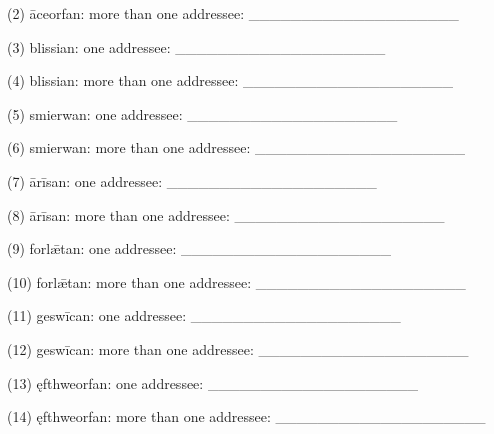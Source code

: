 \begin{minipage}{\linewidth}
(2) āceorfan: more than one addressee: \_\_\_\_\_\_\_\_\_\_\_\_\_\_\_\_\_\_\_\_

(3) blissian: one addressee: \_\_\_\_\_\_\_\_\_\_\_\_\_\_\_\_\_\_\_\_

(4) blissian: more than one addressee: \_\_\_\_\_\_\_\_\_\_\_\_\_\_\_\_\_\_\_\_

(5) smierwan: one addressee: \_\_\_\_\_\_\_\_\_\_\_\_\_\_\_\_\_\_\_\_

(6) smierwan: more than one addressee: \_\_\_\_\_\_\_\_\_\_\_\_\_\_\_\_\_\_\_\_

(7) ārīsan: one addressee: \_\_\_\_\_\_\_\_\_\_\_\_\_\_\_\_\_\_\_\_

(8) ārīsan: more than one addressee: \_\_\_\_\_\_\_\_\_\_\_\_\_\_\_\_\_\_\_\_

(9) forlǣtan: one addressee: \_\_\_\_\_\_\_\_\_\_\_\_\_\_\_\_\_\_\_\_

(10) forlǣtan: more than one addressee: \_\_\_\_\_\_\_\_\_\_\_\_\_\_\_\_\_\_\_\_

(11) geswīcan: one addressee: \_\_\_\_\_\_\_\_\_\_\_\_\_\_\_\_\_\_\_\_

(12) geswīcan: more than one addressee: \_\_\_\_\_\_\_\_\_\_\_\_\_\_\_\_\_\_\_\_

(13) ęfthweorfan: one addressee: \_\_\_\_\_\_\_\_\_\_\_\_\_\_\_\_\_\_\_\_

(14) ęfthweorfan: more than one addressee: \_\_\_\_\_\_\_\_\_\_\_\_\_\_\_\_\_\_\_\_

\end{minipage}\par\addvspace{4pt}

